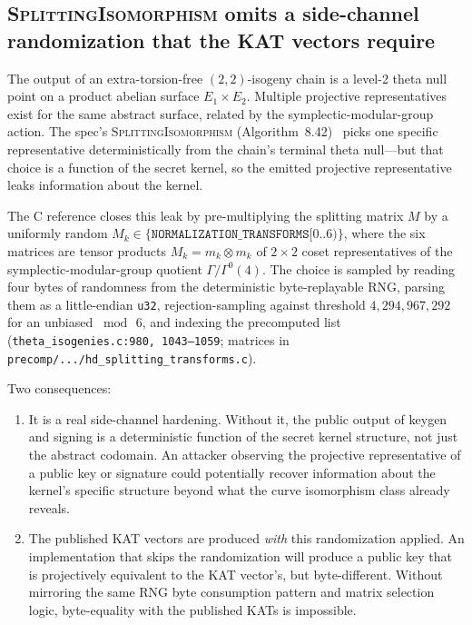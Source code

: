\subsection{\textsc{SplittingIsomorphism} omits a side-channel
randomization that the KAT vectors require}
\label{sec:bug-splitter-randomization}

The output of an extra-torsion-free $(2, 2)$-isogeny chain is a
level-2 theta null point on a product abelian surface
$E_1 \times E_2$.  Multiple projective representatives exist for
the same abstract surface, related by the symplectic-modular-group
action.  The spec's \textsc{SplittingIsomorphism}
(Algorithm~8.42)~\cite{sqisign-spec-v2.0.1} picks one specific
representative deterministically from the chain's terminal theta
null---but that choice is a function of the secret kernel, so the
emitted projective representative leaks information about the
kernel.

The C reference closes this leak by pre-multiplying the splitting
matrix $M$ by a uniformly random $M_k \in
\{\texttt{NORMALIZATION\_TRANSFORMS}[0..6)\}$, where the six
matrices are tensor products $M_k = m_k \otimes m_k$ of $2 \times 2$
coset representatives of the symplectic-modular-group quotient
$\Gamma / \Gamma^0(4)$.  The choice is sampled by reading four bytes
of randomness from the deterministic byte-replayable RNG, parsing
them as a little-endian \texttt{u32}, rejection-sampling against
threshold $4{,}294{,}967{,}292$ for an unbiased $\bmod\,6$, and
indexing the precomputed list (\texttt{theta\_isogenies.c:980,
1043--1059}; matrices in
\texttt{precomp/.../hd\_splitting\_transforms.c}).

Two consequences:

\begin{enumerate}

\item It is a real side-channel hardening.  Without it, the public
output of keygen and signing is a deterministic function of the
secret kernel structure, not just the abstract codomain.  An
attacker observing the projective representative of a public key
or signature could potentially recover information about the
kernel's specific structure beyond what the curve isomorphism class
already reveals.

\item The published KAT vectors are produced \emph{with} this
randomization applied.  An implementation that skips the
randomization will produce a public key that is projectively
equivalent to the KAT vector's, but byte-different.  Without
mirroring the same RNG byte consumption pattern and matrix
selection logic, byte-equality with the published KATs is
impossible.

\end{enumerate}

